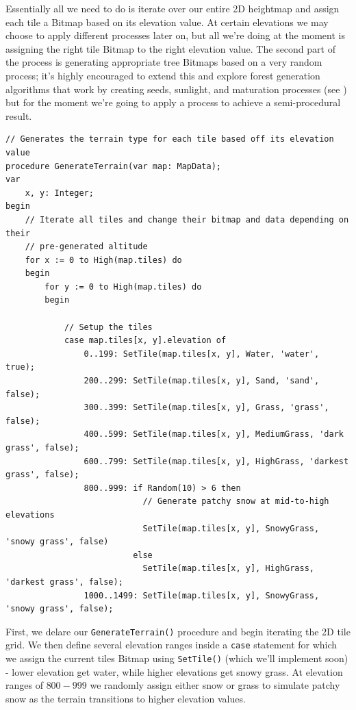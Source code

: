\documentclass{article}
\begin{document}
Essentially all we need to do is iterate over our entire 2D heightmap and assign each tile a Bitmap based on its elevation value. At certain elevations we may choose to apply different processes later on, but all we're doing at the moment is assigning the right tile Bitmap to the right elevation value. The second part of the process is generating appropriate tree Bitmaps based on a very random process; it's highly encouraged to extend this and explore forest generation algorithms that work by creating seeds, sunlight, and maturation processes (see \cite{forests}) but for the moment we're going to apply a process to achieve a semi-procedural result.

\begin{verbatim}
// Generates the terrain type for each tile based off its elevation value
procedure GenerateTerrain(var map: MapData);
var
	x, y: Integer;
begin
	// Iterate all tiles and change their bitmap and data depending on their
	// pre-generated altitude
	for x := 0 to High(map.tiles) do
	begin
		for y := 0 to High(map.tiles) do
		begin

			// Setup the tiles
			case map.tiles[x, y].elevation of
				0..199: SetTile(map.tiles[x, y], Water, 'water', true);
				200..299: SetTile(map.tiles[x, y], Sand, 'sand', false);
				300..399: SetTile(map.tiles[x, y], Grass, 'grass', false);
				400..599: SetTile(map.tiles[x, y], MediumGrass, 'dark grass', false);
				600..799: SetTile(map.tiles[x, y], HighGrass, 'darkest grass', false);
				800..999: if Random(10) > 6 then
							// Generate patchy snow at mid-to-high elevations
							SetTile(map.tiles[x, y], SnowyGrass, 'snowy grass', false)
						  else
							SetTile(map.tiles[x, y], HighGrass, 'darkest grass', false);
				1000..1499: SetTile(map.tiles[x, y], SnowyGrass, 'snowy grass', false);
\end{verbatim}

First, we delare our \texttt{GenerateTerrain()} procedure and begin iterating the 2D tile grid. We then define several elevation ranges inside a \texttt{case} statement for which we assign the current tiles Bitmap using \texttt{SetTile()} (which we'll implement soon) - lower elevation get water, while higher elevations get snowy grass. At elevation ranges of $800-999$ we randomly assign either snow or grass to simulate patchy snow as the terrain transitions to higher elevation values.
\end{document}
